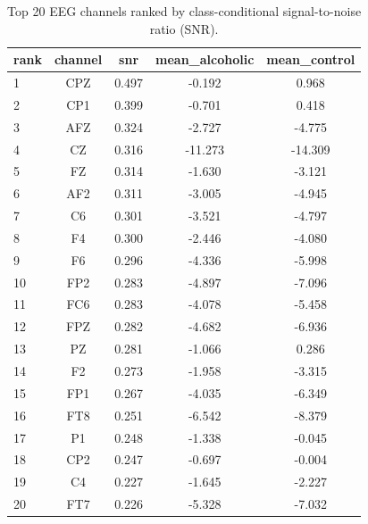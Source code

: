\begin{table}[!t]
\centering
\caption{Top 20 EEG channels ranked by class-conditional signal-to-noise ratio (SNR).}
\label{tab:snr}
\begin{tabular}{lcccc}
\hline
\textbf{rank} & \textbf{channel} & \textbf{snr} & \textbf{mean\_alcoholic} & \textbf{mean\_control} \\
\hline
1 & CPZ & 0.497 & -0.192 & 0.968 \\
2 & CP1 & 0.399 & -0.701 & 0.418 \\
3 & AFZ & 0.324 & -2.727 & -4.775 \\
4 & CZ & 0.316 & -11.273 & -14.309 \\
5 & FZ & 0.314 & -1.630 & -3.121 \\
6 & AF2 & 0.311 & -3.005 & -4.945 \\
7 & C6 & 0.301 & -3.521 & -4.797 \\
8 & F4 & 0.300 & -2.446 & -4.080 \\
9 & F6 & 0.296 & -4.336 & -5.998 \\
10 & FP2 & 0.283 & -4.897 & -7.096 \\
11 & FC6 & 0.283 & -4.078 & -5.458 \\
12 & FPZ & 0.282 & -4.682 & -6.936 \\
13 & PZ & 0.281 & -1.066 & 0.286 \\
14 & F2 & 0.273 & -1.958 & -3.315 \\
15 & FP1 & 0.267 & -4.035 & -6.349 \\
16 & FT8 & 0.251 & -6.542 & -8.379 \\
17 & P1 & 0.248 & -1.338 & -0.045 \\
18 & CP2 & 0.247 & -0.697 & -0.004 \\
19 & C4 & 0.227 & -1.645 & -2.227 \\
20 & FT7 & 0.226 & -5.328 & -7.032 \\
\hline
\end{tabular}
\end{table}
